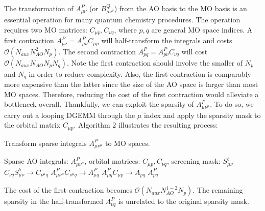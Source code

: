 The transformation of $A_{\mu \nu}^P$ (or $B_{\mu \nu^\nu}^Q$) from the AO basis to the MO basis is 
an essential operation for many quantum 
chemistry procedures. The operation requires two MO matrices: $C_{\mu p}, C_{\nu q}$, where $p, q$ are general MO space
indices. A first contraction $A_{p \nu}^P=A_{\mu \nu}^PC_{\mu p}$ will half-transform the integrals and costs 
$\mathcal{O}(N_{aux}N_{AO}^2N_p)$. The second contraction $A_{p q}^P=A_{p \nu}^PC_{\nu q}$ will cost
$\mathcal{O}(N_{aux}N_{AO}N_pN_q)$.
Note the first contraction should involve the smaller of $N_p$ and $N_q$ in order to reduce complexity. Also, the first contraction
is comparably more expensive than the latter since the size of the AO space is larger than most MO spaces. Therefore,
reducing the cost of the first contraction would alleviate a bottleneck overall. 
Thankfully, we can exploit the sparsity of $A_{\mu \nu^\mu}^P$.
To do so, we carry out a looping DGEMM through the $\mu$ index and apply the sparsity mask to the orbital matrix $C_{\mu p}$.
Algorithm 2 illustrates the resulting process:

\begin{algorithm}[H]
\caption{Transform sparse integrals $A_{\mu \nu^\mu}^P$ to MO spaces.}
\begin{algorithmic}
\REQUIRE Sparse AO integrals: $A_{\mu \nu^\mu}^P$, orbital matrices: $C_{\mu p}, C_{\nu q}$, screening mask: $S_{\mu \nu}^b$
    \STATE $C_{\nu q}S_{\mu \nu}^b \rightarrow C_{\nu^{\mu} q}$
    \STATE $A_{\mu \nu^{\mu}}^P C_{\nu^{\mu} q} \rightarrow A_{\mu q}^P$
\ENDFOR
\STATE $A_{\mu q}^PC_{\mu p} \rightarrow A_{p q}$
\RETURN $A_{p q}^P$
\end{algorithmic}
\end{algorithm}

\noindent The cost of the first contraction becomes $\mathcal{O}(N_{aux}N_{AO}^{1-2}N_p)$. 
The remaining sparsity in the half-transformed $A_{\nu q}^P$ is unrelated to the original sparsity mask.



